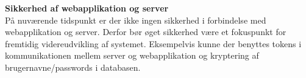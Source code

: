 \textbf{Sikkerhed af webapplikation og server}\\
På nuværende tidspunkt er der ikke ingen sikkerhed i forbindelse med webapplikation og server. Derfor bør øget sikkerhed være et fokuspunkt for fremtidig videreudvikling af systemet. Eksempelvis kunne der benyttes tokens i kommunikationen mellem server og webapplikation og kryptering af brugernavne/passwords i databasen.
